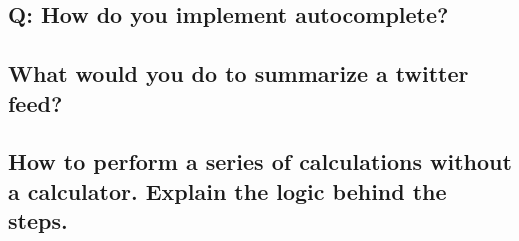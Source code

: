 \subsection{Q: How do you implement autocomplete?}
\subsection{What would you do to summarize a twitter feed?}
\subsection{How to perform a series of calculations without a calculator. Explain the logic behind the steps.}
